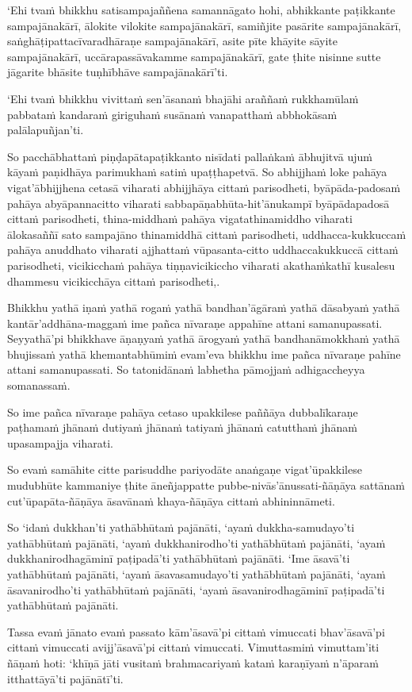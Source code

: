 `Ehi tvaṁ bhikkhu satisampajaññena samannāgato hohi, abhikkante paṭikkante sampajānakārī, ālokite vilokite sampajānakārī, samiñjite pasārite sampajānakārī, saṅghāṭipattacīvaradhāraṇe sampajānakārī, asite pīte khāyite sāyite sampajānakārī, uccārapassāvakamme sampajānakārī, gate ṭhite nisinne sutte jāgarite bhāsite tuṇhībhāve sampajānakārī'ti.

`Ehi tvaṁ bhikkhu vivittaṁ sen'āsanaṁ bhajāhi araññaṁ rukkhamūlaṁ pabbataṁ kandaraṁ giriguhaṁ susānaṁ vanapatthaṁ abbhokāsaṁ palālapuñjan'ti.

So pacchābhattaṁ piṇḍapātapaṭikkanto nisīdati pallaṅkaṁ ābhujitvā ujuṁ kāyaṁ paṇidhāya parimukhaṁ satiṁ upaṭṭhapetvā. So abhijjhaṁ loke pahāya vigat'ābhijjhena cetasā viharati abhijjhāya cittaṁ parisodheti, byāpāda-padosaṁ pahāya abyāpannacitto viharati sabbapāṇabhūta-hit'ānukampī byāpādapadosā cittaṁ parisodheti, thina-middhaṁ pahāya vigatathinamiddho viharati ālokasaññī sato sampajāno thinamiddhā cittaṁ parisodheti, uddhacca-kukkuccaṁ pahāya anuddhato viharati ajjhattaṁ vūpasanta-citto uddhaccakukkuccā cittaṁ parisodheti, vicikicchaṁ pahāya tiṇṇavicikiccho viharati akathaṁkathī kusalesu dhammesu vicikicchāya cittaṁ parisodheti,.

\suttaRef{[MN 107]}

Bhikkhu yathā iṇaṁ yathā rogaṁ yathā bandhan'āgāraṁ yathā dāsabyaṁ yathā kantār'addhāna-maggaṁ ime pañca nīvaraṇe appahīne attani samanupassati. Seyyathā'pi bhikkhave āṇaṇyaṁ yathā ārogyaṁ yathā bandhanāmokkhaṁ yathā bhujissaṁ yathā khemantabhūmiṁ evam'eva bhikkhu ime pañca nīvaraṇe pahīne attani samanupassati. So tatonidānaṁ labhetha pāmojjaṁ adhigaccheyya somanassaṁ.

So ime pañca nīvaraṇe pahāya cetaso upakkilese paññāya dubbalīkaraṇe paṭhamaṁ jhānaṁ dutiyaṁ jhānaṁ tatiyaṁ jhānaṁ catutthaṁ jhānaṁ upasampajja viharati.

So evaṁ samāhite citte parisuddhe pariyodāte anaṅgaṇe vigat'ūpakkilese mudubhūte kammaniye ṭhite āneñjappatte pubbe-nivās'ānussati-ñāṇāya sattānaṁ cut'ūpapāta-ñāṇāya āsavānaṁ khaya-ñāṇāya cittaṁ abhininnāmeti.

So `idaṁ dukkhan'ti yathābhūtaṁ pajānāti, `ayaṁ dukkha-samudayo'ti yathābhūtaṁ pajānāti, `ayaṁ dukkhanirodho'ti yathābhūtaṁ pajānāti, `ayaṁ dukkhanirodhagāminī paṭipadā'ti yathābhūtaṁ pajānāti. `Ime āsavā'ti yathābhūtaṁ pajānāti, `ayaṁ āsavasamudayo'ti yathābhūtaṁ pajānāti, `ayaṁ āsavanirodho'ti yathābhūtaṁ pajānāti, `ayaṁ āsavanirodhagāminī paṭipadā'ti yathābhūtaṁ pajānāti.

Tassa evaṁ jānato evaṁ passato kām'āsavā'pi cittaṁ vimuccati bhav'āsavā'pi cittaṁ vimuccati avijj'āsavā'pi cittaṁ vimuccati. Vimuttasmiṁ vimuttam'iti ñāṇaṁ hoti: `khīṇā jāti vusitaṁ brahmacariyaṁ kataṁ karaṇīyaṁ n'āparaṁ itthattāyā'ti pajānātī'ti.

